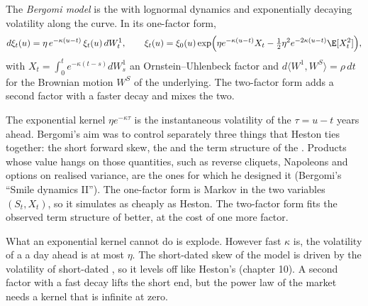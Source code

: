 \begin{definition}\label{def:dv:rough-volatility-and-forward-variance-models:bergomi}
The \emph{Bergomi model} is the  with lognormal dynamics and
exponentially decaying volatility along the curve. In its one-factor form,
\[
d\xi_t(u)=\eta\,e^{-\kappa(u-t)}\,\xi_t(u)\,dW^1_t,\qquad
\xi_t(u)=\xi_0(u)\exp\Bigl(\eta e^{-\kappa(u-t)}X_t-\tfrac12\eta^2e^{-2\kappa(u-t)}\E[X_t^2]\Bigr),
\]
with $X_t=\int_0^te^{-\kappa(t-s)}dW^1_s$ an Ornstein--Uhlenbeck factor and $d\langle W^1,W^S\rangle=\rho\,dt$
for the Brownian motion $W^S$ of the underlying. The two-factor form adds a second factor with a faster decay
and mixes the two.
\end{definition}

The exponential kernel $\eta e^{-\kappa\tau}$ is the instantaneous volatility of the 
$\tau=u-t$ years ahead. Bergomi's aim was to control separately three things that Heston ties together: the
short forward skew, the  and the term structure of the . Products whose value hangs on those quantities, such as reverse cliquets, Napoleons and options
on realised variance, are the ones for which he designed it (Bergomi's ``Smile dynamics II''). The one-factor
form is Markov in the two variables $(S_t,X_t)$, so it simulates as cheaply as Heston. The two-factor form
fits the observed term structure of  better, at the cost of one more factor.

What an exponential kernel cannot do is explode. However fast $\kappa$ is, the volatility of a
 a day ahead is at most $\eta$. The short-dated skew of the model is driven by the volatility
of short-dated , so it levels off like Heston's (chapter 10). A second factor with a fast
decay lifts the short end, but the power law of the market needs a kernel that is infinite at zero.

